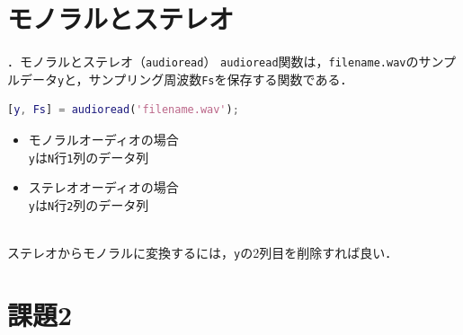 \documentclass[aspectratio=43]{beamer}
\newcommand{\showsec}{\thesection ．}
\begin{document}
\section{モノラルとステレオ}
\begin{frame}[t,containsverbatim]{\showsec モノラルとステレオ（\texttt{audioread}）}
    \texttt{audioread}関数は，\texttt{filename.wav}のサンプルデータ\texttt{y}と，サンプリング周波数\texttt{Fs}を保存する関数である．
    \begin{lstlisting}[language={Matlab},xleftmargin={0mm},frame={lines}]
[y, Fs] = audioread('filename.wav');
\end{lstlisting}
    \begin{minipage}[t]{.49\textwidth}
        \begin{itemize}
            \item モノラルオーディオの場合\\
                  \texttt{y}は\texttt{N}行\texttt{1}列のデータ列
        \end{itemize}
    \end{minipage}
    \begin{minipage}[t]{.49\textwidth}
        \begin{itemize}
            \item ステレオオーディオの場合\\
                  \texttt{y}は\texttt{N}行\texttt{2}列のデータ列
        \end{itemize}
    \end{minipage}
    \vspace{2em}\\
    ステレオからモノラルに変換するには，\texttt{y}の2列目を削除すれば良い．
\end{frame}
\section{課題2}
\end{document}
